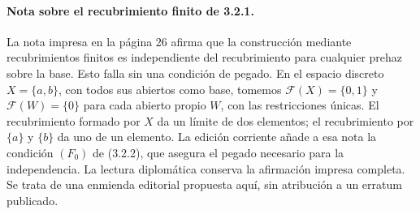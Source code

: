 \paragraph{Nota sobre el recubrimiento finito de 3.2.1.}
La nota impresa en la página 26 afirma que la construcción mediante recubrimientos finitos es independiente del recubrimiento para cualquier prehaz sobre la base. Esto falla sin una condición de pegado. En el espacio discreto $X=\{a,b\}$, con todos sus abiertos como base, tomemos $\mathcal{F}(X)=\{0,1\}$ y $\mathcal{F}(W)=\{0\}$ para cada abierto propio $W$, con las restricciones únicas. El recubrimiento formado por $X$ da un límite de dos elementos; el recubrimiento por $\{a\}$ y $\{b\}$ da uno de un elemento. La edición corriente añade a esa nota la condición $(F_0)$ de (3.2.2), que asegura el pegado necesario para la independencia. La lectura diplomática conserva la afirmación impresa completa. Se trata de una enmienda editorial propuesta aquí, sin atribución a un erratum publicado.
